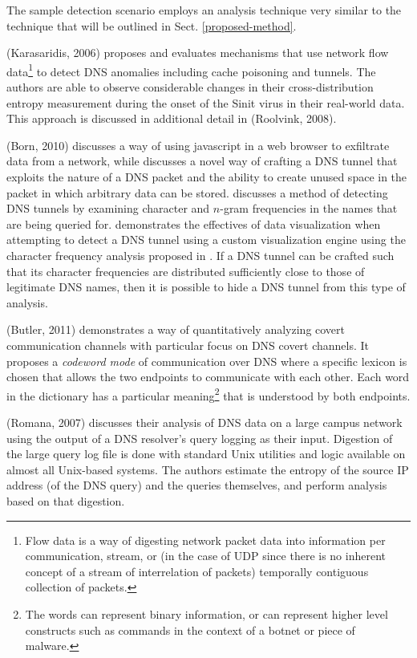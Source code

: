 \documentclass{llncs}
\begin{document}
The sample detection scenario employs an analysis technique very similar to the
technique that will be outlined in Sect. \ref{proposed-method}.

(Karasaridis, 2006)\cite{Karasaridis2006} proposes and evaluates mechanisms that
use network flow data\footnote{Flow data is a way of digesting network packet
data into information per communication, stream, or (in the case of UDP since
there is no inherent concept of a stream of interrelation of packets) temporally
contiguous collection of packets.} to detect DNS anomalies including cache
poisoning and tunnels. The
authors are able to observe considerable changes in their cross-distribution
entropy measurement during the onset of the Sinit virus in their real-world
data. This approach is discussed in additional detail in (Roolvink,
2008)\cite{Roolvink2008}.

\label{litreview-dns-cfa} (Born, 2010)\cite{Born2010.exfil} discusses a way of
using javascript in a web browser to exfiltrate data from a network, while
\cite{Born2010.psudp} discusses a novel way of crafting a DNS tunnel that
exploits the nature of a DNS packet and the ability to create unused space in
the packet in which arbitrary data can be stored. \cite{Born2010.cfa} discusses
a method of detecting DNS tunnels by examining character and $n$-gram
frequencies in the names that are being queried for. \cite{Born2010.ngviz}
demonstrates the effectives of data visualization when attempting to detect a
DNS tunnel using a custom visualization engine using the character frequency
analysis proposed in \cite{Born2010.cfa}. If a DNS tunnel
can be crafted such that its character frequencies are distributed sufficiently
close to those of legitimate DNS names, then it is possible to hide a DNS tunnel
from this type of analysis.

(Butler, 2011)\cite{Butler2011} demonstrates a way of quantitatively analyzing
covert communication channels with particular focus on DNS covert channels. It
proposes a \emph{codeword mode} of communication over DNS where a specific
lexicon is chosen that allows the two endpoints to communicate with each other.
Each word in the dictionary has a particular meaning\footnote{The words can
represent binary information, or can represent higher level constructs such as
commands in the context of a botnet or piece of malware.} that is understood by
both endpoints.

(Romana, 2007)\cite{Romana2007} discusses their analysis of DNS data on a large
campus network using the output of a DNS resolver's query logging as their
input. Digestion of the large query log file is done with standard Unix
utilities and logic available on almost all Unix-based systems. The authors
estimate the entropy of the source IP address (of the DNS query) and the queries
themselves, and perform analysis based on that digestion.
\end{document}
